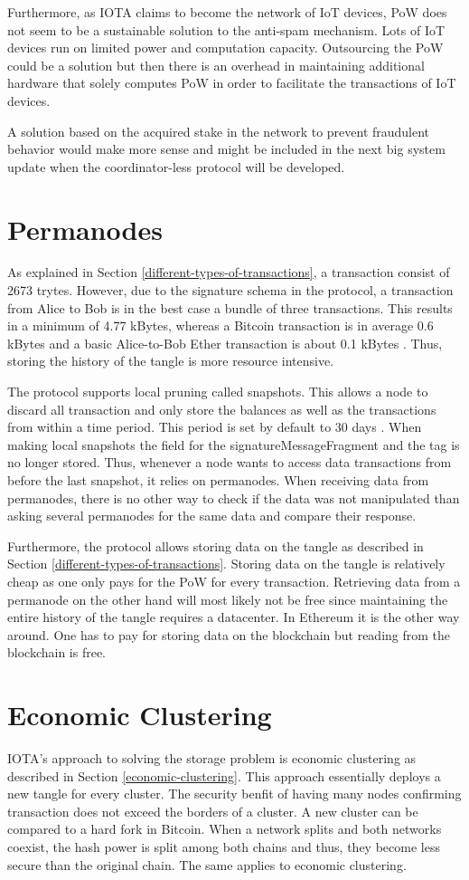 Furthermore, as IOTA claims to become the network of IoT devices, PoW does not seem to be a sustainable solution to the anti-spam mechanism. Lots of IoT devices run on limited power and computation capacity. Outsourcing the PoW could be a solution but then there is an overhead in maintaining additional hardware that solely computes PoW in order to facilitate the transactions of IoT devices.


A solution based on the acquired stake in the network to prevent fraudulent behavior would make more sense and might be included in the next big system update when the coordinator-less protocol will be developed.

\section{Permanodes}
As explained in Section \ref{different-types-of-transactions}, a transaction consist of 2673 trytes. However, due to the signature schema in the protocol, a transaction from Alice to Bob is in the best case a bundle of three transactions. This results in a minimum of 4.77 kBytes, whereas a Bitcoin transaction is in average 0.6 kBytes \cite{transaction-size} and a basic Alice-to-Bob Ether transaction is about 0.1 kBytes \cite{transaction-size-eth}. Thus, storing the history of the tangle is more resource intensive.

The protocol supports local pruning called snapshots. This allows a node to discard all transaction and only store the balances as well as the transactions from within a time period. This period is set by default to 30 days \cite{local-snapshots}. When making local snapshots the field for the signatureMessageFragment and the tag is no longer stored. Thus, whenever a node wants to access data transactions from before the last snapshot, it relies on permanodes.
When receiving data from permanodes, there is no other way to check if the data was not manipulated than asking several permanodes for the same data and compare their response. 

Furthermore, the protocol allows storing data on the tangle as described in Section \ref{different-types-of-transactions}. Storing data on the tangle is relatively cheap as one only pays for the PoW for every transaction. Retrieving data from a permanode on the other hand will most likely not be free since maintaining the entire history of the tangle requires a datacenter. In Ethereum it is the other way around. One has to pay for storing data on the blockchain but reading from the blockchain is free.

\section{Economic Clustering}
IOTA's approach to solving the storage problem is economic clustering as described in Section \ref{economic-clustering}. This approach essentially deploys a new tangle for every cluster. The security benfit of having many nodes confirming transaction does not exceed the borders of a cluster. A new cluster can be compared to a hard fork in Bitcoin. When a network splits and both networks coexist, the hash power is split among both chains and thus, they become less secure than the original chain. The same applies to economic clustering. 